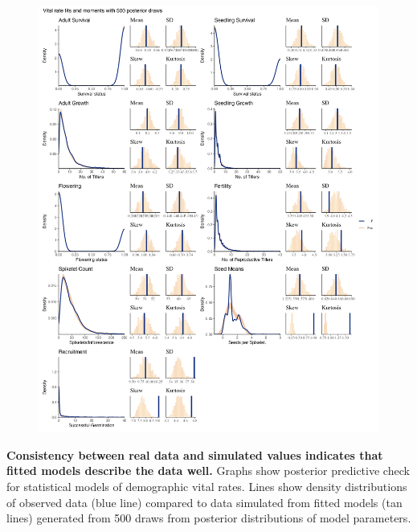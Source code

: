 \documentclass[12pt]{article}
\begin{document}
\begin{figure}
	\centering
	\includegraphics[width=.7\linewidth]{fitsandmoments_plot.png}
\end{figure}
 \textbf{Consistency between real data and simulated values indicates that fitted models describe the data well.} Graphs show posterior predictive check for statistical models of demographic vital rates. Lines show density distributions of observed data (blue line) compared to data simulated from fitted models (tan lines) generated from 500 draws from posterior distributions of model parameters. 
\newpage
\end{document}
